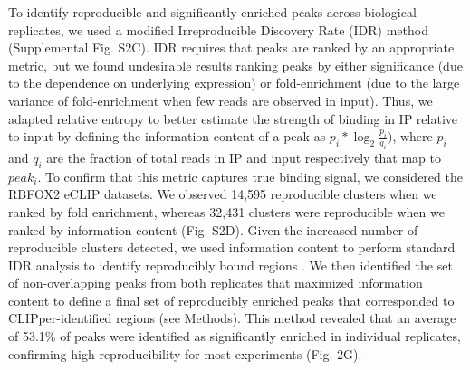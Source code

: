 To identify reproducible and significantly enriched peaks across biological replicates, we used a modified Irreproducible Discovery Rate (IDR) method (Supplemental Fig. S2C). IDR requires that peaks are ranked by an appropriate metric, but we found undesirable results ranking peaks by either significance (due to the dependence on underlying expression) or fold-enrichment (due to the large variance of fold-enrichment when few reads are observed in input). Thus, we adapted relative entropy to better estimate the strength of binding in IP relative to input by defining the information content of a peak as $p_i*\log_2\frac{p_i}{q_i})$, where $p_i$ and $q_i$ are the fraction of total reads in IP and input respectively that map to $peak_i$. To confirm that this metric captures true binding signal, we considered the RBFOX2 eCLIP datasets. We observed 14,595 reproducible clusters when we ranked by fold enrichment, whereas 32,431 clusters were reproducible when we ranked by information content (Fig. S2D). Given the increased number of reproducible clusters detected, we used information content to perform standard IDR analysis to identify reproducibly bound regions \cite{Li2011}. We then identified the set of non-overlapping peaks from both replicates that maximized information content to define a final set of reproducibly enriched peaks that corresponded to CLIPper-identified regions (see Methods). This method revealed that an average of 53.1\% of peaks were identified as significantly enriched in individual replicates, confirming high reproducibility for most experiments (Fig. 2G).


